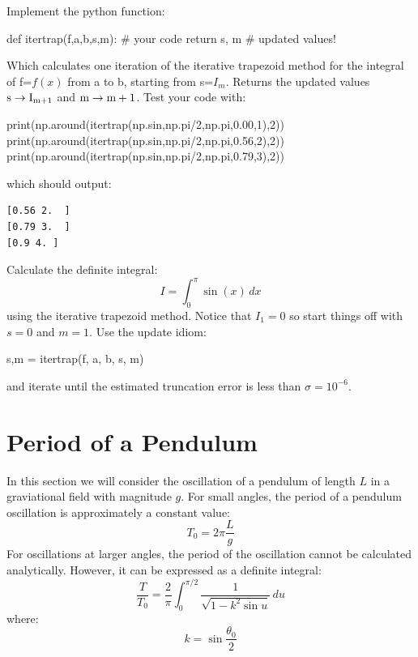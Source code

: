 \plot Implement the python function:
\begin{python}
def itertrap(f,a,b,s,m):
   # your code
   return s, m # updated values! 
\end{python}
Which calculates one iteration of the iterative trapezoid method for
the integral of f=$f(x)$ from a to b, starting from s=$I_{m}$. Returns
the updated values $\rm{s} \to I_{m+1}$ and $\rm{m} \to m+1$.
Test your code with:
\begin{python}
print(np.around(itertrap(np.sin,np.pi/2,np.pi,0.00,1),2))
print(np.around(itertrap(np.sin,np.pi/2,np.pi,0.56,2),2))
print(np.around(itertrap(np.sin,np.pi/2,np.pi,0.79,3),2))
\end{python}
which should output:
\begin{verbatim}
[0.56 2.  ]
[0.79 3.  ]
[0.9 4. ]
\end{verbatim}

\plot Calculate the definite integral:
\begin{displaymath}
I = \int_0^\pi \sin(x) \, dx
\end{displaymath}
using the iterative trapezoid method.  Notice that $I_1 = 0$ so start things off with $s=0$ and $m=1$.  Use the update idiom:
\begin{python}
s,m = itertrap(f, a, b, s, m)
\end{python}
and iterate until the estimated truncation error is less than $\sigma=10^{-6}$.


\section{Period of a Pendulum}

In this section we will consider the oscillation of a pendulum of length $L$ in a graviational field with magnitude $g$.  For small angles, the period of a pendulum oscillation is approximately a constant value:
\begin{displaymath}
T_0 = 2\pi \frac{L}{g}
\end{displaymath}
For oscillations at larger angles, the period of the oscillation cannot be calculated analytically. However, it can be expressed as a definite integral:
\begin{equation}
\label{eqn:elliptic}
\frac{T}{T_0} = \frac{2}{\pi}\int_0^{\pi/2}\frac{1}{\sqrt{1-k^2\sin u}}\,du 
\end{equation}
where:
\begin{displaymath}
k = \sin \frac{\theta_0}{2}
\end{displaymath}

